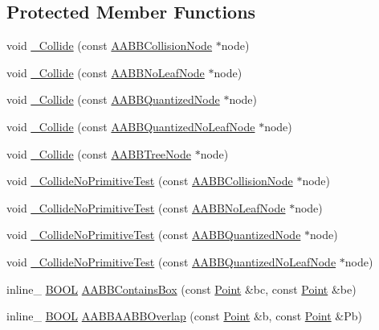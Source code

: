 \subsection*{Protected Member Functions}
\begin{DoxyCompactItemize}
\item 
void \hyperlink{class_a_a_b_b_collider_aa4aa676986ee7f507e957e45f2f5b4ba}{\+\_\+\+Collide} (const \hyperlink{class_a_a_b_b_collision_node}{A\+A\+B\+B\+Collision\+Node} $\ast$node)
\item 
void \hyperlink{class_a_a_b_b_collider_a7ff71717c0c1ef6d3894fc9ab5e5dcfa}{\+\_\+\+Collide} (const \hyperlink{class_a_a_b_b_no_leaf_node}{A\+A\+B\+B\+No\+Leaf\+Node} $\ast$node)
\item 
void \hyperlink{class_a_a_b_b_collider_ae779f38892cb3398c0c1d893f3f6f277}{\+\_\+\+Collide} (const \hyperlink{class_a_a_b_b_quantized_node}{A\+A\+B\+B\+Quantized\+Node} $\ast$node)
\item 
void \hyperlink{class_a_a_b_b_collider_a9b38f0dda1f0ba7b3225f0f8f2abbf25}{\+\_\+\+Collide} (const \hyperlink{class_a_a_b_b_quantized_no_leaf_node}{A\+A\+B\+B\+Quantized\+No\+Leaf\+Node} $\ast$node)
\item 
void \hyperlink{class_a_a_b_b_collider_ae5e560d946cf02643db63f8856bcb1f9}{\+\_\+\+Collide} (const \hyperlink{class_a_a_b_b_tree_node}{A\+A\+B\+B\+Tree\+Node} $\ast$node)
\item 
void \hyperlink{class_a_a_b_b_collider_aa8eaafb1934f7961ce7caedae4a3142d}{\+\_\+\+Collide\+No\+Primitive\+Test} (const \hyperlink{class_a_a_b_b_collision_node}{A\+A\+B\+B\+Collision\+Node} $\ast$node)
\item 
void \hyperlink{class_a_a_b_b_collider_a9a23722e23e4d49d248f85daa0482772}{\+\_\+\+Collide\+No\+Primitive\+Test} (const \hyperlink{class_a_a_b_b_no_leaf_node}{A\+A\+B\+B\+No\+Leaf\+Node} $\ast$node)
\item 
void \hyperlink{class_a_a_b_b_collider_a700cf755f32326cd8c68c4bbcb3c4b1f}{\+\_\+\+Collide\+No\+Primitive\+Test} (const \hyperlink{class_a_a_b_b_quantized_node}{A\+A\+B\+B\+Quantized\+Node} $\ast$node)
\item 
void \hyperlink{class_a_a_b_b_collider_a440e56705eec03a65d56a66a44f41bc7}{\+\_\+\+Collide\+No\+Primitive\+Test} (const \hyperlink{class_a_a_b_b_quantized_no_leaf_node}{A\+A\+B\+B\+Quantized\+No\+Leaf\+Node} $\ast$node)
\item 
inline\+\_\+ \hyperlink{_ice_types_8h_a050c65e107f0c828f856a231f4b4e788}{B\+O\+O\+L} \hyperlink{class_a_a_b_b_collider_acaf48dddc7a502bc5ab386d4f98277cd}{A\+A\+B\+B\+Contains\+Box} (const \hyperlink{class_point}{Point} \&bc, const \hyperlink{class_point}{Point} \&be)
\item 
\hypertarget{class_a_a_b_b_collider_af6d6c23f0570d0181a7e2d37d4ba0cad}{inline\+\_\+ \hyperlink{_ice_types_8h_a050c65e107f0c828f856a231f4b4e788}{B\+O\+O\+L} \hyperlink{class_a_a_b_b_collider_af6d6c23f0570d0181a7e2d37d4ba0cad}{A\+A\+B\+B\+A\+A\+B\+B\+Overlap} (const \hyperlink{class_point}{Point} \&b, const \hyperlink{class_point}{Point} \&Pb)}\label{class_a_a_b_b_collider_af6d6c23f0570d0181a7e2d37d4ba0cad}


\end{DoxyCompactItemize}
